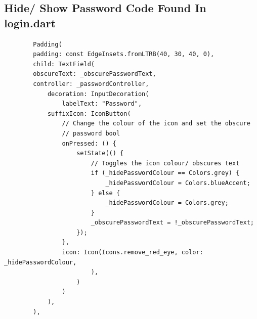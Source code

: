 \documentclass[12pt]{article}
\begin{document}
	\subsection{Hide/ Show Password Code Found In login.dart}
	\label{code:obscure-text}
	\begin{verbatim}
		Padding(
		padding: const EdgeInsets.fromLTRB(40, 30, 40, 0),
		child: TextField(
		obscureText: _obscurePasswordText,
		controller: _passwordController,
			decoration: InputDecoration(
				labelText: "Password",
			suffixIcon: IconButton(
				// Change the colour of the icon and set the obscure 
				// password bool
				onPressed: () {
					setState(() {
						// Toggles the icon colour/ obscures text
						if (_hidePasswordColour == Colors.grey) {
							_hidePasswordColour = Colors.blueAccent;
						} else {
							_hidePasswordColour = Colors.grey;
						}
						_obscurePasswordText = !_obscurePasswordText;
					});
				},
				icon: Icon(Icons.remove_red_eye, color: _hidePasswordColour,
						),
					)
				)
			),
		),
		\end{verbatim}

	
\end{document}
